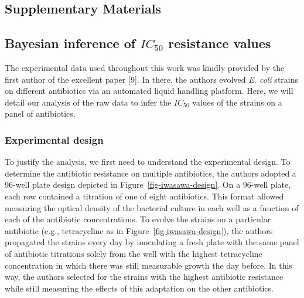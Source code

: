 \documentclass[
]{scrartcl}
\newcommand{\beginsupplement}{
\setcounter{page}{1} %
\setcounter{section}{0} %
\renewcommand{\thesection}{}
\renewcommand{\thesubsection}{\Alph{subsection}}
\setcounter{table}{0} %
\renewcommand{\thetable}{\Alph{table}}
\setcounter{figure}{0} %
\renewcommand{\thefigure}{\Alph{figure}}%
\setcounter{equation}{0} %
\renewcommand{\theequation}{S\arabic{equation}}%
}
\begin{document}
\begin{refsection}
\beginsupplement

\tableofcontents

\section*{Supplementary Materials}\label{supplementary-materials}

\subsection{\texorpdfstring{Bayesian inference of \(IC_{50}\) resistance
values}{Bayesian inference of IC\_\{50\} resistance values}}\label{bayesian-inference-of-ic_50-resistance-values}

The experimental data used throughout this work was kindly provided by
the first author of the excellent paper {[}9{]}. In there, the authors
evolved \emph{E. coli} strains on different antibiotics via an automated
liquid handling platform. Here, we will detail our analysis of the raw
data to infer the \(IC_{50}\) values of the strains on a panel of
antibiotics.

\subsubsection{Experimental design}\label{experimental-design}

To justify the analysis, we first need to understand the experimental
design. To determine the antibiotic resistance on multiple antibiotics,
the authors adopted a 96-well plate design depicted in
Figure~\ref{fig-iwasawa-design}. On a 96-well plate, each row contained
a titration of one of eight antibiotics. This format allowed measuring
the optical density of the bacterial culture in each well as a function
of each of the antibiotic concentrations. To evolve the strains on a
particular antibiotic (e.g., tetracycline as in
Figure~\ref{fig-iwasawa-design}), the authors propagated the strains
every day by inoculating a fresh plate with the same panel of antibiotic
titrations solely from the well with the highest tetracycline
concentration in which there was still measurable growth the day before.
In this way, the authors selected for the strains with the highest
antibiotic resistance while still measuring the effects of this
adaptation on the other antibiotics.


\end{refsection}
\end{document}
